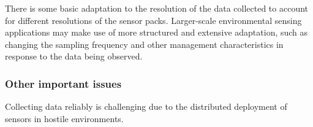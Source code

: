 There is some basic adaptation to the resolution of the data collected to account for different resolutions of the sensor packs.
Larger-scale environmental sensing applications may
make use of more structured and extensive adaptation, such as
changing the sampling frequency and other management characteristics in
response to the data being observed.


 \subsubsection*{Other important issues}



Collecting data reliably is challenging due to the distributed deployment of sensors in hostile environments.










